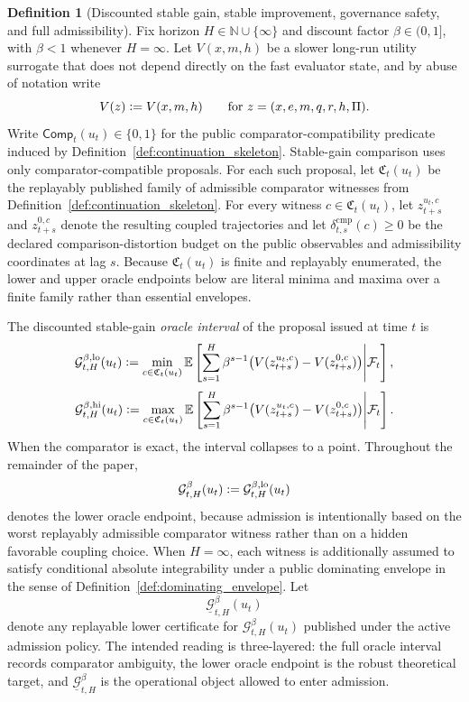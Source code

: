\documentclass[11pt]{article}
\theoremstyle{definition}
\newtheorem{definition}[theorem]{Definition}
\newcommand{\N}{\mathbb{N}}
\newcommand{\E}{\mathbb{E}}
\newcommand{\1}{\mathbf{1}}
\newcommand{\Defeq}{\vcentcolon=}
\begin{document}
\begin{definition}[Discounted stable gain, stable improvement, governance safety, and full admissibility]\label{def:full_admissibility}
Fix horizon $H\in\N\cup\{\infty\}$ and discount factor $\beta\in(0,1]$, with $\beta<1$ whenever $H=\infty$. Let $V(x,m,h)$ be a slower long-run utility surrogate that does not depend directly on the fast evaluator state, and by abuse of notation write
\[
V(z)\Defeq V(x,m,h)\qquad\text{for }z=(x,e,m,q,r,h,\Pi).
\]
Write $\mathsf{Comp}_t(u_t)\in\{0,1\}$ for the public comparator-compatibility predicate induced by Definition~\ref{def:continuation_skeleton}. Stable-gain comparison uses only comparator-compatible proposals. For each such proposal, let $\mathfrak C_t(u_t)$ be the replayably published family of admissible comparator witnesses from Definition~\ref{def:continuation_skeleton}. For every witness $c\in\mathfrak C_t(u_t)$, let $z_{t+s}^{u_t,c}$ and $z_{t+s}^{0,c}$ denote the resulting coupled trajectories and let $\delta_{t,s}^{\mathrm{cmp}}(c)\ge 0$ be the declared comparison-distortion budget on the public observables and admissibility coordinates at lag $s$. Because $\mathfrak C_t(u_t)$ is finite and replayably enumerated, the lower and upper oracle endpoints below are literal minima and maxima over a finite family rather than essential envelopes.

The discounted stable-gain \emph{oracle interval} of the proposal issued at time $t$ is
\[
\mathcal G_{t,H}^{\beta,\mathrm{lo}}(u_t)
\Defeq
\min_{c\in\mathfrak C_t(u_t)}
\E\left[
\sum_{s=1}^{H}\beta^{s-1}\bigl(V(z_{t+s}^{u_t,c})-V(z_{t+s}^{0,c})\bigr)
\middle|\mathcal F_t
\right],
\]
\[
\mathcal G_{t,H}^{\beta,\mathrm{hi}}(u_t)
\Defeq
\max_{c\in\mathfrak C_t(u_t)}
\E\left[
\sum_{s=1}^{H}\beta^{s-1}\bigl(V(z_{t+s}^{u_t,c})-V(z_{t+s}^{0,c})\bigr)
\middle|\mathcal F_t
\right].
\]
When the comparator is exact, the interval collapses to a point. Throughout the remainder of the paper,
\[
\mathcal G_{t,H}^{\beta}(u_t)\Defeq \mathcal G_{t,H}^{\beta,\mathrm{lo}}(u_t)
\]
denotes the lower oracle endpoint, because admission is intentionally based on the worst replayably admissible comparator witness rather than on a hidden favorable coupling choice. When $H=\infty$, each witness is additionally assumed to satisfy conditional absolute integrability under a public dominating envelope in the sense of Definition~\ref{def:dominating_envelope}. Let
\[
\underline{\mathcal G}_{t,H}^{\beta}(u_t)
\]
denote any replayable lower certificate for $\mathcal G_{t,H}^{\beta}(u_t)$ published under the active admission policy. The intended reading is three-layered: the full oracle interval records comparator ambiguity, the lower oracle endpoint is the robust theoretical target, and $\underline{\mathcal G}_{t,H}^{\beta}$ is the operational object allowed to enter admission.


\end{definition}
\end{document}
